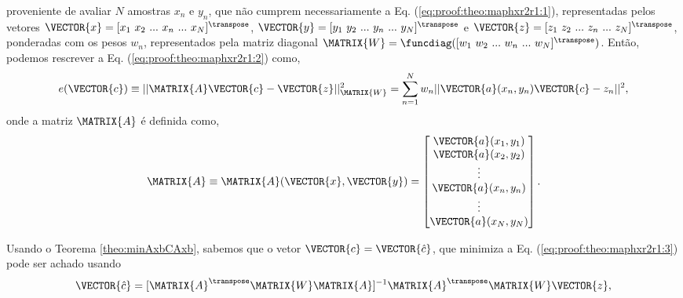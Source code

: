 \begin{myproofT}
proveniente de avaliar $N$ amostras $x_n$ e $y_n$, 
que não cumprem necessariamente a Eq. (\ref{eq:proof:theo:maphxr2r1:1}), 
representadas pelos vetores 
$\VECTOR{x}=[x_1~ x_2~ ...~ x_n~ ...~ x_N]^{\transpose}$,
$\VECTOR{y}=[y_1~ y_2~ ...~ y_n~ ...~ y_N]^{\transpose}$ e 
$\VECTOR{z}=[z_1~ z_2~ ...~ z_n~ ...~ z_N]^{\transpose}$,
ponderadas com os pesos $w_n$, representados pela matriz diagonal $\MATRIX{W}=\funcdiag([w_1~ w_2~ ...~ w_n~ ...~ w_N]^{\transpose})$.
Então, podemos rescrever a Eq. (\ref{eq:proof:theo:maphxr2r1:2}) como,
\begin{equation}\label{eq:proof:theo:maphxr2r1:3}
e(\VECTOR{c}) \equiv ||\MATRIX{A}\VECTOR{c}-\VECTOR{z}||_{\MATRIX{W}}^2 =  \sum_{n=1}^{N} w_n||\VECTOR{a}(x_n,y_n)\VECTOR{c}-z_n||^2,
\end{equation}
onde a matriz $\MATRIX{A}$ é definida como,
\begin{equation}\label{eq:proof:maphxr2r1:4}
\MATRIX{A}\equiv \MATRIX{A}(\VECTOR{x},\VECTOR{y})=\begin{bmatrix}
\VECTOR{a}(x_1,y_1)\\
\VECTOR{a}(x_2,y_2)\\
\vdots\\
\VECTOR{a}(x_n,y_n)\\
\vdots\\
\VECTOR{a}(x_N,y_N)
\end{bmatrix}.
\end{equation}


Usando o Teorema \ref{theo:minAxbCAxb}, sabemos que o vetor $\VECTOR{c}=\VECTOR{\hat{c}}$,
que minimiza a Eq. (\ref{eq:proof:theo:maphxr2r1:3}) pode ser achado usando 
\begin{equation}\label{eq:proof:theo:maphxr2r1:5}
\VECTOR{\hat{c}}=[\MATRIX{A}^{\transpose}\MATRIX{W}\MATRIX{A}]^{-1}\MATRIX{A}^{\transpose}\MATRIX{W}\VECTOR{z},
\end{equation}
\end{myproofT}
